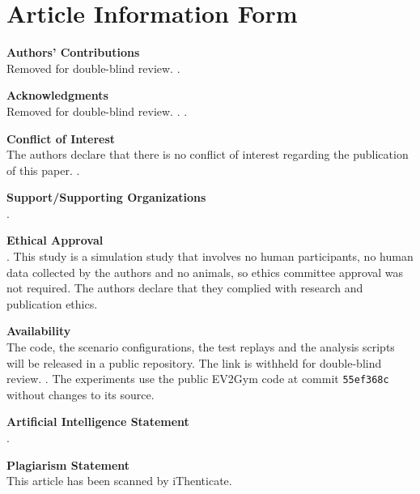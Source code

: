 \section*{Article Information Form}

\textbf{Authors' Contributions}\\
\ifanonymous
Removed for double-blind review.
\else
{}.
\fi

\textbf{Acknowledgments}\\
\ifanonymous
Removed for double-blind review.
\else
{}.
\fi
{}.

\textbf{Conflict of Interest}\\
The authors declare that there is no conflict of interest regarding the publication of this paper.
.

\textbf{Support/Supporting Organizations}\\
.

\textbf{Ethical Approval}\\
.
This study is a simulation study that involves no human participants, no human data collected by the authors and no animals, so ethics committee approval was not required.
The authors declare that they complied with research and publication ethics.

\textbf{Availability}\\
The code, the scenario configurations, the test replays and the analysis scripts will be released in a public repository.
\ifanonymous
The link is withheld for double-blind review.
\else
{}.
\fi
The experiments use the public EV2Gym code at commit \texttt{55ef368c} without changes to its source.

\textbf{Artificial Intelligence Statement}\\
.

\textbf{Plagiarism Statement}\\
This article has been scanned by iThenticate\texttrademark.
